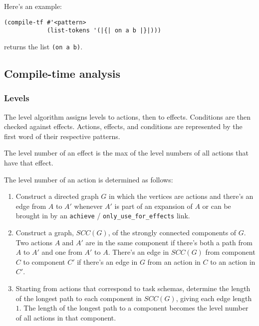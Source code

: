 \noindent
Here's an example:

\label{list-gen-example}
\begin{verbatim}
(compile-tf #'<pattern>
            (list-tokens '(|{| on a b |}|)))
\end{verbatim}

\noindent
returns the list {\tt (on a b)}.


\subsection{Compile-time analysis}

\subsubsection{Levels}

The level algorithm assigns levels to actions, then to effects.
Conditions are then checked against effects.  Actions, effects,
and conditions are represented by the first word of their
respective patterns.

The level number of an effect is the max of the level numbers
of all actions that have that effect.

The level number of an action is determined as follows:

\begin{enumerate}

  \item

     Construct a directed graph $G$ in which the vertices are actions
     and there's an edge from $A$ to $A'$ whenever $A'$ is part of an
     expansion of $A$ or can be brought in by an {\tt achieve} / 
     {\tt only\_use\_for\_effects} link.

  \item

     Construct a graph, $SCC(G)$, of the strongly connected components
     of $G$.  Two actions $A$ and $A'$ are in the same component if there's
     both a path from $A$ to $A'$ and one from $A'$ to $A$.  There's an edge
     in $SCC(G)$ from component $C$ to component $C'$ if there's an edge
     in $G$ from an action in $C$ to an action in $C'$.

  \item

     Starting from actions that correspond to task schemas, determine
     the length of the longest path to each component in $SCC(G)$,
     giving each edge length $1$.
     The length of the longest path to a component becomes the
     level number of all actions in that component.

\end{enumerate}


